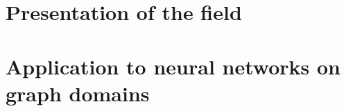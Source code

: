 \documentclass[12pt]{book}
\begin{document}

%
%


%
%

\dominitoc
\tableofcontents




  \chapter{Presentation of the field}
  \vfill\minitoc\newpage
  \newpage

  \newpage
  \newpage
  \newpage

%
%



%
%
 \setcounter{chapter}{2}
 \chapter{Application to neural networks on graph domains}
 \vfill\minitoc\newpage
 \newpage


 \newpage

%
%
\end{document}
